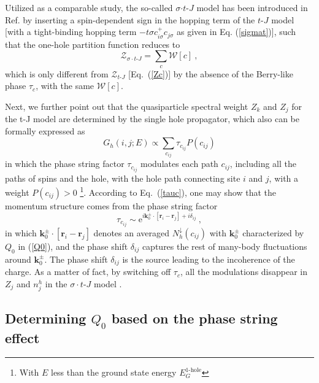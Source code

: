 \documentclass[aps,prb,twocolumn,notitlepage,superscriptaddress,showpacs]{revtex4-1}
\newcommand{\E}{\mathrm{e}}
\begin{document}
Utilized as a comparable study, the so-called $\sigma$$\cdot$$t$-$J$ model has been introduced in Ref.  by inserting a spin-dependent sign in the hopping term of the $t$-$J$ model [with a tight-binding hopping term $-t\sigma c_{i\sigma}^+c_{j\sigma}$ as given in Eq. (\ref{sigmat})], such that the one-hole partition function reduces to \cite{ZZ2013}
\begin{equation}\label{Zstj}
\mathcal{Z}_{\sigma\cdot t\text{-}J}=\sum_{c}\mathcal{W}[c]~,
\end{equation}
which is only different from $\mathcal{Z}_{t\text{-}J}$ [Eq.~(\ref{Zc})] by the absence of the Berry-like phase ${\tau }_{c}$, with the same $\mathcal{W}[c]$.

Next, we further point out that the quasiparticle spectral weight $Z_k$ and $Z_j$  for the t-J model are determined by the single hole propagator, which also can be formally expressed as \cite{Sheng1996,Wu2008sign}
\begin{equation}\label{G}
G_h(i, j; E)\propto \sum_{c_{ij}}\tau_{c_{ij}} P(c_{ij})
\end{equation}
in which the phase string factor $\tau_{c_{ij}}$ modulates each path $c_{ij}$, including all the paths of spins and the hole, with the hole path connecting site $i$ and $j$, with a weight $P(c_{ij})>0$ \footnote{With $E$ less than the ground state energy $E_G^{\text{1-hole}}$}. According to Eq.~(\ref{tauc}), one may show \cite{ZZ2014cm} that the momentum structure comes from the phase string factor
\begin{equation}\label{psij}
\tau_{c_{ij}} \sim \E^{i\mathbf {k}_0^{\pm}\cdot [{\mathbf r}_i-{\mathbf r}_j]+i\delta_{ij}} ~,
\end{equation}
in which $\mathbf {k}_0^{\pm} \cdot [{\mathbf r}_i-{\mathbf r}_j]$ denotes an averaged $N_h^ \downarrow(c_{ij})$ with $\mathbf {k}_0^{\pm}$ characterized by $Q_0$ in (\ref{Q0}), and the phase shift $\delta_{ij}$ captures the rest of many-body fluctuations around $\mathbf {k}_0^{\pm}$. The phase shift $\delta_{ij}$ is the source leading to the incoherence of the charge. As a matter of fact, by switching off $\tau_c$, all the modulations disappear in $Z_j$ and $n_j^h$ in the $\sigma\cdot$$t$-$J$ model \cite{ZZ2013,ZZ2014qp,ZZ2014cm}.


\subsection{Determining $Q_0$ based on the phase string effect}
\end{document}
